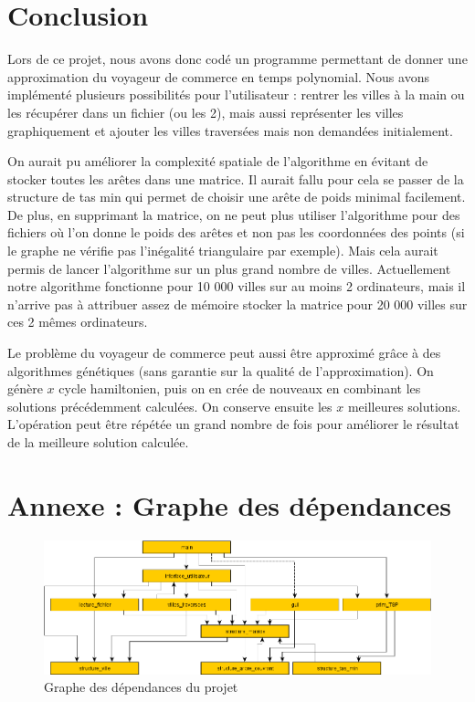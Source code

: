 \documentclass[a4paper,11pt]{article}
\begin{document}
\section{Conclusion} %

Lors de ce projet, nous avons donc codé un programme permettant de donner une approximation du voyageur de commerce en temps polynomial. Nous avons implémenté plusieurs possibilités pour l'utilisateur : rentrer les villes à la main ou les récupérer dans un fichier (ou les 2), mais aussi représenter les villes graphiquement et ajouter les villes traversées mais non demandées initialement.

On aurait pu améliorer la complexité spatiale de l'algorithme en évitant de stocker toutes les arêtes dans une matrice. Il aurait fallu pour cela se passer de la structure de tas min qui permet de choisir une arête de poids minimal facilement. De plus, en supprimant la matrice, on ne peut plus utiliser l'algorithme pour des fichiers où l'on donne le poids des arêtes et non pas les coordonnées des points (si le graphe ne vérifie pas l'inégalité triangulaire par exemple). Mais cela aurait permis de lancer l'algorithme sur un plus grand nombre de villes. Actuellement notre algorithme fonctionne  pour 10 000 villes sur au moins 2 ordinateurs, mais il n'arrive pas à attribuer assez de mémoire stocker la matrice pour 20 000 villes sur ces 2 mêmes ordinateurs.

Le problème du voyageur de commerce peut aussi être approximé grâce à des algorithmes génétiques (sans garantie sur la qualité de l'approximation). 
On génère $x$ cycle hamiltonien, puis on en crée de nouveaux en combinant les solutions précédemment calculées. On conserve ensuite les $x$ meilleures solutions. L'opération peut être répétée un grand nombre de fois pour améliorer le résultat de la meilleure solution calculée.

\section{Annexe : Graphe des dépendances}
\begin{center}
\begin{figure}[h]
\begin{center}
\includegraphics[scale=0.55]{depandance.png}
\caption{Graphe des dépendances du projet}
\label{fig3}
\end{center}
\end{figure}
\end{center}
\end{document}
